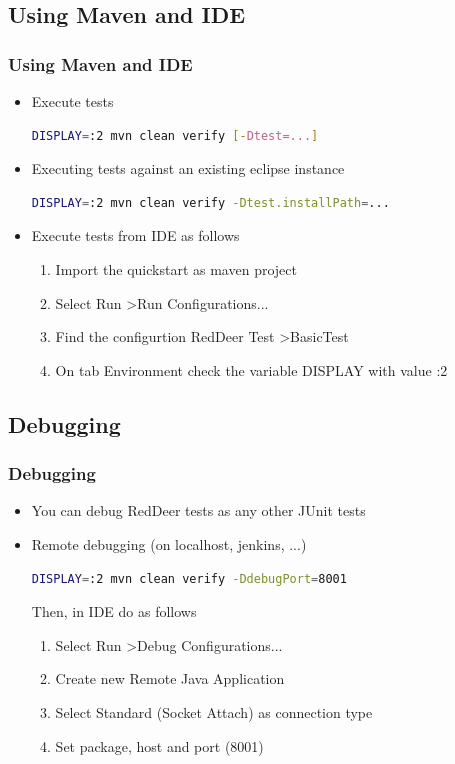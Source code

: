 \documentclass{beamer}
\begin{document}
\subsection{Using Maven and IDE}
\begin{frame}[fragile]
\frametitle{Using Maven and IDE}
\begin{itemize}
\item Execute tests
\begin{lstlisting}[language=sh]
DISPLAY=:2 mvn clean verify [-Dtest=...]
\end{lstlisting}
\item Executing tests against an existing eclipse instance
\begin{lstlisting}[language=sh]
DISPLAY=:2 mvn clean verify -Dtest.installPath=...
\end{lstlisting}
\item Execute tests from IDE as follows
\begin{enumerate}
\item Import the quickstart as maven project
\item Select Run \textgreater Run Configurations...
\item Find the configurtion RedDeer Test \textgreater BasicTest
\item On tab Environment check the variable DISPLAY with value :2
\end{enumerate}
\end{itemize}
\end{frame}

\subsection{Debugging}
\begin{frame}[fragile]
\frametitle{Debugging}
\begin{itemize}
\item You can debug RedDeer tests as any other JUnit tests
\item Remote debugging (on localhost, jenkins, ...)
\begin{lstlisting}[language=sh]
DISPLAY=:2 mvn clean verify -DdebugPort=8001
\end{lstlisting}
Then, in IDE do as follows
\begin{enumerate}
\item Select Run \textgreater Debug Configurations...
\item Create new Remote Java Application
\item Select Standard (Socket Attach) as connection type
\item Set package, host and port (8001)
\end{enumerate}
\end{itemize}
\end{frame}
\end{document}
